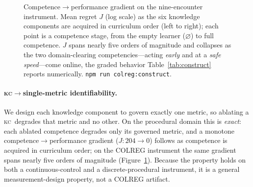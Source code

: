 \documentclass{article}
\newcommand{\kc}{\textsc{kc}}
\begin{document}
\begin{figure}[t]
\centering
{}
\caption{Competence$\to$performance gradient on the nine-encounter instrument. Mean regret
$J$ (log scale) as the six knowledge components are acquired in curriculum order (left to
right); each point is a competence stage, from the empty learner ($\varnothing$) to full
competence. $J$ spans nearly five orders of magnitude and collapses as the two
domain-clearing competencies---acting \emph{early} and at a \emph{safe speed}---come online,
the graded behavior Table~\ref{tab:construct} reports numerically. \texttt{npm run colreg:construct}.}
\label{fig:gradient}
\end{figure}

\paragraph{\kc$\to$single-metric identifiability.} We design each knowledge component to
govern exactly one metric, so ablating a \kc\ degrades that metric and no other. On the
procedural domain this is \emph{exact}: each ablated competence degrades only its governed
metric, and a monotone competence$\to$performance gradient ($J:204\to 0$) follows as
competence is acquired in curriculum order; on the COLREG instrument the same gradient spans
nearly five orders of magnitude (Figure~\ref{fig:gradient}). Because the property holds on both a
continuous-control and a discrete-procedural instrument, it is a general measurement-design
property, not a COLREG artifact.
\end{document}
